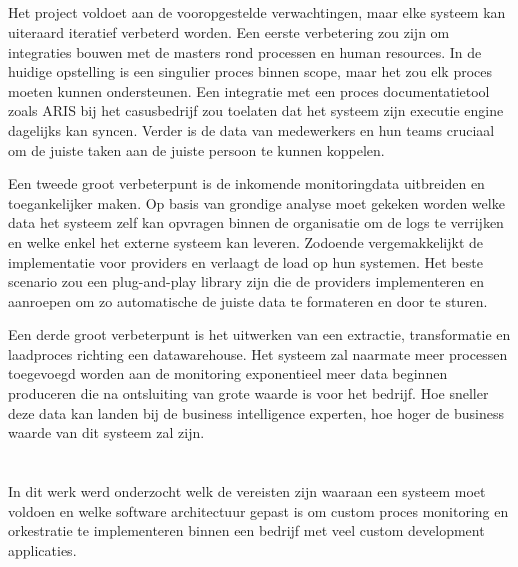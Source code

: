 \subsection{}%
\label{subsec:mogelijke verbeteringen}
Het project voldoet aan de vooropgestelde verwachtingen, maar elke systeem kan uiteraard iteratief verbeterd worden. Een eerste verbetering zou zijn om integraties bouwen met de masters rond processen en human resources. In de huidige opstelling is een singulier proces binnen scope, maar het zou elk proces moeten kunnen ondersteunen. Een integratie met een proces documentatietool zoals ARIS bij het casusbedrijf zou toelaten dat het systeem zijn executie engine dagelijks kan syncen.  Verder is de data van medewerkers en hun teams cruciaal om de juiste taken aan de juiste persoon te kunnen koppelen. \newline

Een tweede groot verbeterpunt is de inkomende monitoringdata uitbreiden en toegankelijker maken. Op basis van grondige analyse moet gekeken worden welke data het systeem zelf kan opvragen binnen de organisatie om de logs te verrijken en welke enkel het externe systeem kan leveren. Zodoende vergemakkelijkt de implementatie voor providers en verlaagt de load op hun systemen. Het beste scenario zou een plug-and-play library zijn die de providers implementeren en aanroepen om zo automatische de juiste data te formateren en door te sturen. \newline

Een derde groot verbeterpunt is het uitwerken van een extractie, transformatie en laadproces richting een datawarehouse. Het systeem zal naarmate meer processen toegevoegd worden aan de monitoring exponentieel meer data beginnen produceren die na ontsluiting van grote waarde is voor het bedrijf. Hoe sneller deze data kan landen bij de business intelligence experten, hoe hoger de business waarde van dit systeem zal zijn.

\section{}%
\label{sec:inhoudelijke conclusie}
In dit werk werd onderzocht welk de vereisten zijn waaraan een systeem moet voldoen en welke software architectuur gepast is om custom proces monitoring en orkestratie te implementeren binnen een bedrijf met veel custom development applicaties. \newline

